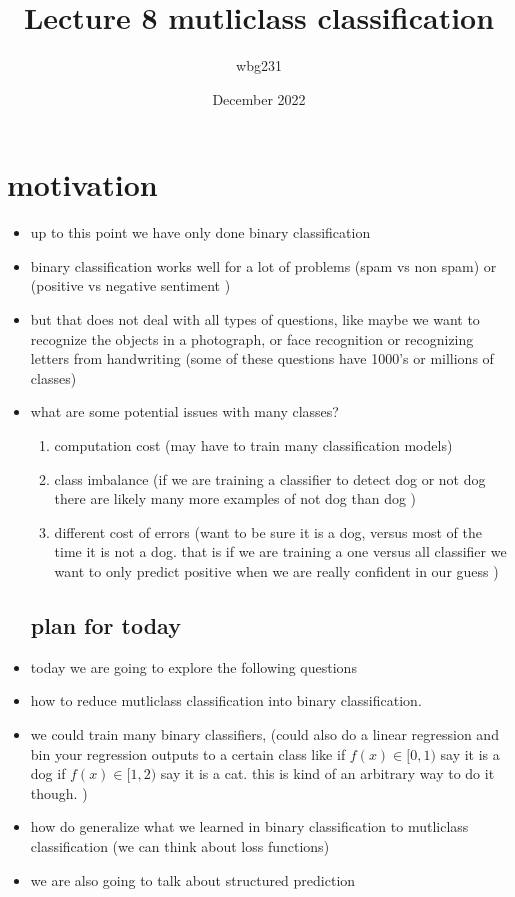 \documentclass{article}
\title{Lecture 8 mutliclass classification }
\author{wbg231 }
\date{December 2022}
\begin{document}
\maketitle

\section{motivation}
\begin{itemize}
\item up to this point we have only done binary classification
\item binary classification works well for a lot of problems (spam vs non spam) or (positive vs negative sentiment )
\item but that does not deal with all types of questions, like maybe we want to recognize the objects
in a photograph, or face recognition or recognizing letters from handwriting  (some of these questions
have 1000's or millions of classes)
\item what are some potential issues with many classes? 
\begin{enumerate}
    \item computation cost (may have to train many classification models)
    \item class imbalance (if we are training a classifier to detect dog or not dog there are likely many more examples of not dog than dog )
    \item different cost of errors (want to be sure it is a dog, versus most of the time it is not a dog. that is if we are training a one versus all classifier we want to only predict positive when we are really confident in our guess )
\end{enumerate}
\subsection*{plan for today}
\item today we are going to explore the following questions
\item how to reduce mutliclass classification into binary classification. 
\item we could train many binary classifiers, (could also do a linear regression and bin your regression outputs to a certain class like if $f(x)\in [0,1)$ say it is a dog if $f(x)\in [1,2)$ say it is a cat. this is kind of an arbitrary way to do it though. ) 
\item how do generalize what we learned in binary classification to mutliclass classification (we can think about loss functions)
\item we are also going to talk about structured prediction

\end{itemize}
\end{document}
